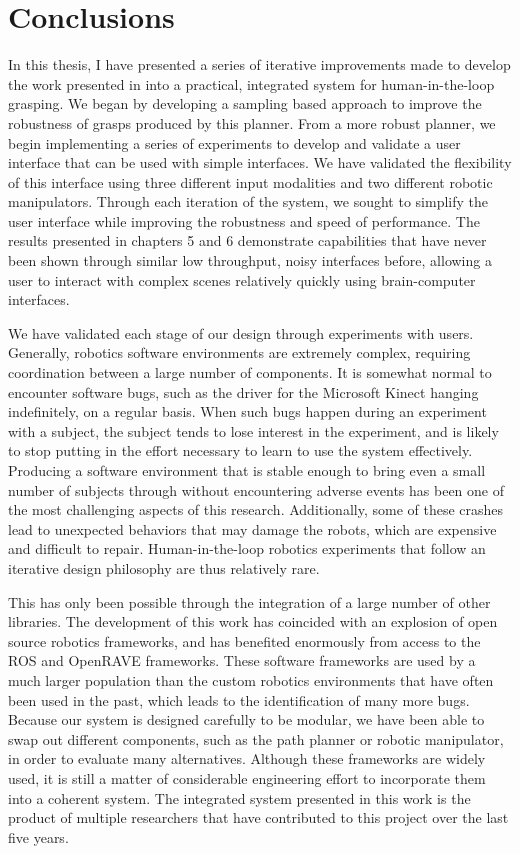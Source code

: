 \chapter{Conclusions}
In this thesis, I have presented a series of iterative improvements made to develop the work presented in \cite{eigengrasp} into a practical, integrated system for human-in-the-loop grasping. We began by developing a sampling based approach to improve the robustness of grasps produced by this planner. From a more robust planner, we begin implementing a series of experiments to develop and validate a user interface that can be used with simple interfaces. We have validated the flexibility of this interface using three different input modalities and two different robotic manipulators. Through each iteration of the system, we sought to simplify the user interface while improving the robustness and speed of performance. The results presented in chapters 5 and 6 demonstrate capabilities that have never been shown through similar low throughput, noisy interfaces before, allowing a user to interact with complex scenes relatively quickly using brain-computer interfaces. 

We have validated each stage of our design through experiments with users. Generally, robotics software environments are extremely complex, requiring coordination between a large number of components. It is somewhat normal to encounter software bugs, such as the driver for the Microsoft Kinect hanging indefinitely, on a regular basis. When such bugs happen during an experiment with a subject, the subject tends to lose interest in the experiment, and is likely to stop putting in the effort necessary to learn to use the system effectively. Producing a software environment that is stable enough to bring even a small number of subjects through without encountering adverse events has been one of the most challenging aspects of this research. Additionally, some of these crashes lead to unexpected behaviors that may damage the robots, which are expensive and difficult to repair. Human-in-the-loop robotics experiments that follow an iterative design philosophy are thus relatively rare.

This has only been possible through the integration of a large number of other libraries. The development of this work has coincided with an explosion of open source robotics frameworks, and has benefited enormously from access to the ROS and OpenRAVE frameworks. These software frameworks are used by a much larger population than the custom robotics environments that have often been used in the past, which leads to the identification of many more bugs. Because our system is designed carefully to be modular, we have been able to swap out different components, such as the path planner or robotic manipulator, in order to evaluate many alternatives. Although these frameworks are widely used, it is still a matter of considerable engineering effort to incorporate them into a coherent system. The integrated system presented in this work is the product of multiple researchers that have contributed to this project over the last five years.

